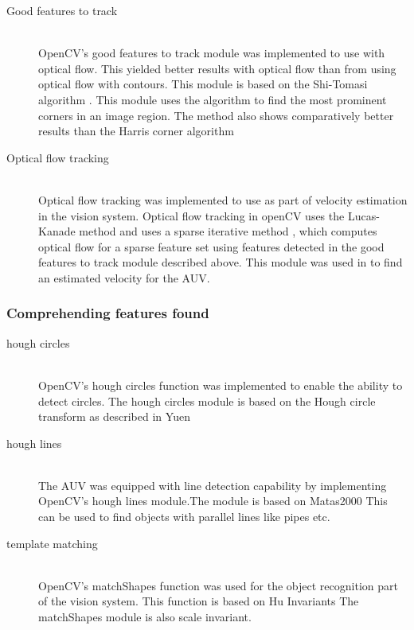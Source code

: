 \begin{description}
\item[Good features to track]\hfill \\
OpenCV's good features to track module was implemented to use with optical flow. This yielded better results with optical flow than from using optical flow with contours. This module is based on the Shi-Tomasi algorithm \cite{article:tomasi}. This module uses the algorithm to find the most prominent corners in an image region. The method also shows comparatively better results than the Harris corner algorithm \cite{article:tomasi}

\item[Optical flow tracking]\hfill \\
Optical flow tracking was implemented to use as part of velocity estimation in the vision system. Optical flow tracking in openCV uses the Lucas-Kanade method and uses a sparse iterative method \cite{web:opticalFlow}, which computes optical flow for a sparse feature set using features detected in the good features to track module described above. This module was used in to find an estimated velocity for the AUV.

\end{description}

\subsubsection{Comprehending features found} 
\begin{description}
\item[hough circles]\hfill \\
OpenCV's hough circles function was implemented to enable the ability to detect circles. The hough circles module is based on the Hough circle transform as described in Yuen \cite{article:yuen} 

\item[hough lines]\hfill \\
The AUV was equipped with line detection capability by implementing OpenCV's hough lines module.The module is based on Matas2000 \cite{article:matas} This can be used to find objects with parallel lines like pipes etc.

\item[template matching]\hfill \\
OpenCV's matchShapes function was used for the object recognition part of the vision system. This function is based on Hu Invariants \cite{article:hu} The matchShapes module is also scale invariant.
\end{description}

